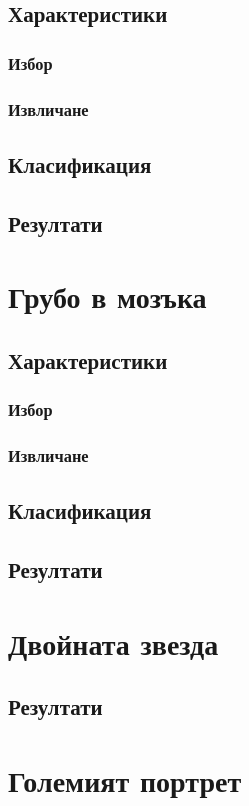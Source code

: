 \documentclass[12pt]{report}
\begin{document}
    \section{Характеристики}
        \subsection{Избор}
        \subsection{Извличане}
    \section{Класификация}    
    \section{Резултати}

\chapter{Грубо в мозъка}
    \section{Характеристики}
        \subsection{Избор}
        \subsection{Извличане}
    \section{Класификация}    
    \section{Резултати}
\chapter{Двойната звезда}
    \section{Резултати}
\chapter{Големият портрет}
\end{document}
